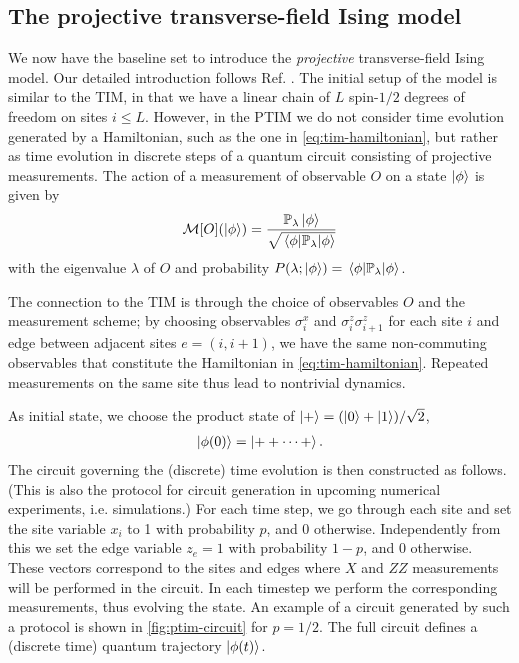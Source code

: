 \subsection{The projective transverse-field Ising model}\label{sec:the-ptim}
We now have the baseline set to introduce the \emph{projective}
transverse-field Ising model. Our detailed introduction follows Ref.
\cite{langEntanglementTransitionProjective2020}. 
The initial setup of the model is similar to the
TIM, in that we have a linear chain of $L$ spin-$1 /2$ degrees of freedom on sites
$i\leq L$. However, in the PTIM we do not consider time evolution generated by
a Hamiltonian, such as the one in \cref{eq:tim-hamiltonian}, but rather as time
evolution in discrete steps of a quantum circuit consisting of projective
measurements. The action of a measurement of observable $O$ on a state
$\ket{\phi}$ is given by
\begin{align}
  \mathcal{M}[O](\ket{\phi}) =
  \frac{\mathbb{P}_\lambda\ket{\phi}}{\sqrt{\expval{\mathbb{P}_\lambda}{\phi}}}
\end{align}
with the eigenvalue $\lambda$ of $O$ and probability $P(\lambda;
\ket{\phi}) = \expval{\mathbb{P}_\lambda}{\phi}$.

The connection to the TIM is through the choice of observables $O$ and the
measurement scheme; by choosing
observables $\sigma^x_i$ and $\sigma_i^z\sigma_{i+1}^z$ for each site $i$ and
edge between adjacent sites $e=(i,i+1)$, we have the same non-commuting observables that
constitute the Hamiltonian in \cref{eq:tim-hamiltonian}. Repeated measurements
on the same site thus lead to nontrivial dynamics.

As initial state, we choose the product state of $\ket{+} = (\ket{0} + \ket{1})
/ \sqrt{2}$,
\begin{align}
  \ket{\phi(0)} = \ket{++\cdots +}
.\end{align}
The circuit governing the (discrete) time evolution is then constructed as
follows. (This is also the protocol for circuit generation in upcoming numerical
experiments, i.e. simulations.) For each time step, we go through each site and
set the site variable $x_i$ to 1 with probability $p$, and 0 otherwise.
Independently from this we set the edge variable $z_e=1$ with probability
$1-p$, and 0 otherwise. These vectors correspond to the sites and edges where
$X$ and $ZZ$ measurements will be performed in the circuit. In each timestep we
perform the corresponding measurements, thus evolving the state. An example of
a circuit generated by such a protocol is shown in \cref{fig:ptim-circuit} for
$p=1 /2$. The full circuit defines a (discrete time) quantum trajectory
$\ket{\phi(t)}$.


